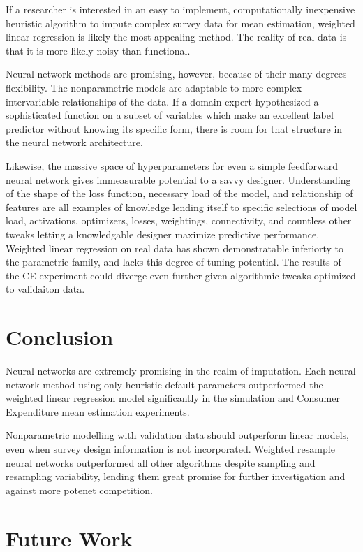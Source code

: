 \documentclass[12pt,twoside]{reedthesis}
\begin{document}
If a researcher is interested in an easy to implement, computationally
inexpensive heuristic algorithm to impute complex survey data for mean
estimation, weighted linear regression is likely the most appealing
method. The reality of real data is that it is more likely noisy than
functional.

Neural network methods are promising, however, because of their many
degrees flexibility. The nonparametric models are adaptable to more
complex intervariable relationships of the data. If a domain expert
hypothesized a sophisticated function on a subset of variables which
make an excellent label predictor without knowing its specific form,
there is room for that structure in the neural network architecture.

Likewise, the massive space of hyperparameters for even a simple
feedforward neural network gives immeasurable potential to a savvy
designer. Understanding of the shape of the loss function, necessary
load of the model, and relationship of features are all examples of
knowledge lending itself to specific selections of model load,
activations, optimizers, losses, weightings, connectivity, and countless
other tweaks letting a knowledgable designer maximize predictive
performance. Weighted linear regression on real data has shown
demonstratable inferiorty to the parametric family, and lacks this
degree of tuning potential. The results of the CE experiment could
diverge even further given algorithmic tweaks optimized to validaiton
data.

\section{Conclusion}\label{conclusion-1}

Neural networks are extremely promising in the realm of imputation. Each
neural network method using only heuristic default parameters
outperformed the weighted linear regression model significantly in the
simulation and Consumer Expenditure mean estimation experiments.

Nonparametric modelling with validation data should outperform linear
models, even when survey design information is not incorporated.
Weighted resample neural networks outperformed all other algorithms
despite sampling and resampling variability, lending them great promise
for further investigation and against more potenet competition.

\section{Future Work}\label{work}
\end{document}
